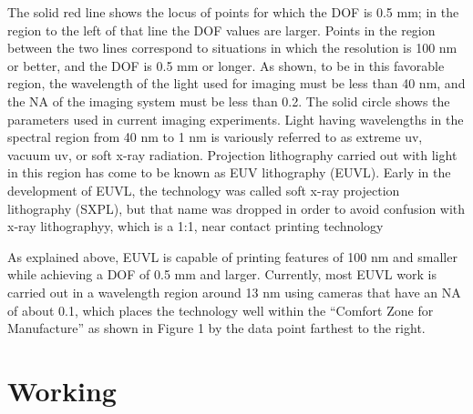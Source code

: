 \documentclass[12pt,a4paper]{report}
\begin{document}
 The solid red line shows the locus of points for which the
DOF is 0.5 mm; in the region to the left of that line the
DOF values are larger. Points in the region between the
two lines correspond to situations in which the resolution
is 100 nm or better, and the DOF is 0.5 mm or longer. As
shown, to be in this favorable region, the wavelength of
the light used for imaging must be less than 40 nm, and
the NA of the imaging system must be less than 0.2. The
solid circle shows the parameters used in current imaging
experiments. Light having wavelengths in the spectral
region from 40 nm to 1 nm is variously referred to as
extreme uv, vacuum uv, or soft x-ray radiation.
Projection lithography carried out with light in this
region has come to be known as EUV lithography
(EUVL). Early in the development of EUVL, the
technology was called soft x-ray projection lithography
(SXPL), but that name was dropped in order to avoid
confusion with x-ray lithographyy, which is a 1:1, 
near contact printing technology


As explained above, EUVL is capable of printing features
of 100 nm and smaller while achieving a DOF of 0.5 mm
and larger. Currently, most EUVL work is carried out in
a wavelength region around 13 nm using cameras that
have an NA of about 0.1, which places the technology
well within the “Comfort Zone for Manufacture” as
shown in Figure 1 by the data point farthest to the right.




\section{Working}
\end{document}
